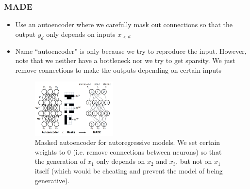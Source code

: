\subsubsection{MADE}
\begin{itemize}
	\item Use an autoencoder where we carefully mask out connections so that the output $y_d$ only depends on inputs $x_{<d}$
	\item Name ``autoencoder'' is only because we try to reproduce the input. However, note that we neither have a bottleneck nor we try to get sparsity. We just remove connections to make the outputs depending on certain inputs
	\begin{figure}[ht!]
		\centering
		\includegraphics[width=0.4\textwidth]{figures/Autoregressive_MADE.png}
		\caption{Masked autoencoder for autoregressive models. We set certain weights to 0 (i.e. remove connections between neurons) so that the generation of $x_1$ only depends on $x_2$ and $x_3$, but not on $x_1$ itself (which would be cheating and prevent the model of being generative).}
	\end{figure}
\end{itemize}
